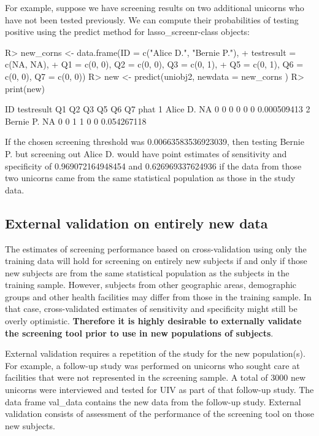 \documentclass[11pt]{report}
\renewenvironment{Schunk}{\vspace{\topsep}}{\vspace{\topsep}}
\begin{document}
For example, suppose we have screening results on two additional
unicorns who have not been tested previously. We can compute their
probabilities of testing positive using the \textsf{predict} method for
\textsf{lasso\_screenr}-class objects:
\begin{Schunk}
\begin{Sinput}
R> new_corns <- data.frame(ID = c("Alice D.", "Bernie P."),
+                         testresult = c(NA, NA),
+                         Q1 = c(0, 0), Q2 = c(0, 0), Q3 = c(0, 1),
+                         Q5 = c(0, 1), Q6 = c(0, 0), Q7 = c(0, 0))
R> new <- predict(uniobj2,  newdata = new_corns )
R> print(new)
\end{Sinput}
\begin{Soutput}
         ID testresult Q1 Q2 Q3 Q5 Q6 Q7        phat
1  Alice D.         NA  0  0  0  0  0  0 0.000509413
2 Bernie P.         NA  0  0  1  1  0  0 0.054267118
\end{Soutput}
\end{Schunk}

If the chosen screening threshold was 0.00663583536923039, then
testing Bernie P.  but screening out Alice D. would have point
estimates of sensitivity and specificity of 0.969072164948454
and 0.626969337624936 if the data from those two unicorns came
from the same statistical population as those in the study data.

\subsection*{External validation on entirely new data}

The estimates of screening performance based on cross-validation using
only the training data will hold for screening on entirely new
subjects if and only if those new subjects are from the same
statistical population as the subjects in the training
sample. However, subjects from other geographic areas, demographic
groups and other health facilities may differ from those in the
training sample. In that case, cross-validated estimates of
sensitivity and specificity might still be overly optimistic.
\textbf{Therefore it is highly desirable to externally validate the
screening tool prior to use in new populations of subjects}.

External validation requires a repetition of the study for the new
population(s). For example, a follow-up study was performed on
unicorns who sought care at facilities that were not represented in
the screening sample. A total of 3000 new unicorns
were interviewed and tested for UIV as part of that follow-up
study. The data frame \textsf{val\_data} contains the new data from
the follow-up study. External validation consists of assessment of the
performance of the screening tool on those new subjects.
\end{document}
